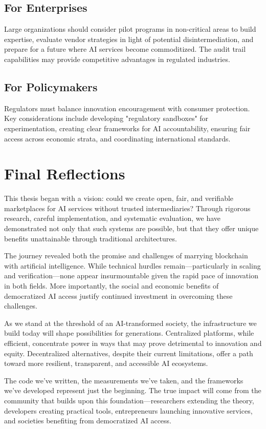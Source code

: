 \subsection{For Enterprises}
Large organizations should consider pilot programs in non-critical areas to build expertise, evaluate vendor strategies in light of potential disintermediation, and prepare for a future where AI services become commoditized. The audit trail capabilities may provide competitive advantages in regulated industries.

\subsection{For Policymakers}
Regulators must balance innovation encouragement with consumer protection. Key considerations include developing "regulatory sandboxes" for experimentation, creating clear frameworks for AI accountability, ensuring fair access across economic strata, and coordinating international standards.

\section{Final Reflections}

This thesis began with a vision: could we create open, fair, and verifiable marketplaces for AI services without trusted intermediaries? Through rigorous research, careful implementation, and systematic evaluation, we have demonstrated not only that such systems are possible, but that they offer unique benefits unattainable through traditional architectures.

The journey revealed both the promise and challenges of marrying blockchain with artificial intelligence. While technical hurdles remain—particularly in scaling and verification—none appear insurmountable given the rapid pace of innovation in both fields. More importantly, the social and economic benefits of democratized AI access justify continued investment in overcoming these challenges.

As we stand at the threshold of an AI-transformed society, the infrastructure we build today will shape possibilities for generations. Centralized platforms, while efficient, concentrate power in ways that may prove detrimental to innovation and equity. Decentralized alternatives, despite their current limitations, offer a path toward more resilient, transparent, and accessible AI ecosystems.

The code we've written, the measurements we've taken, and the frameworks we've developed represent just the beginning. The true impact will come from the community that builds upon this foundation—researchers extending the theory, developers creating practical tools, entrepreneurs launching innovative services, and societies benefiting from democratized AI access.

